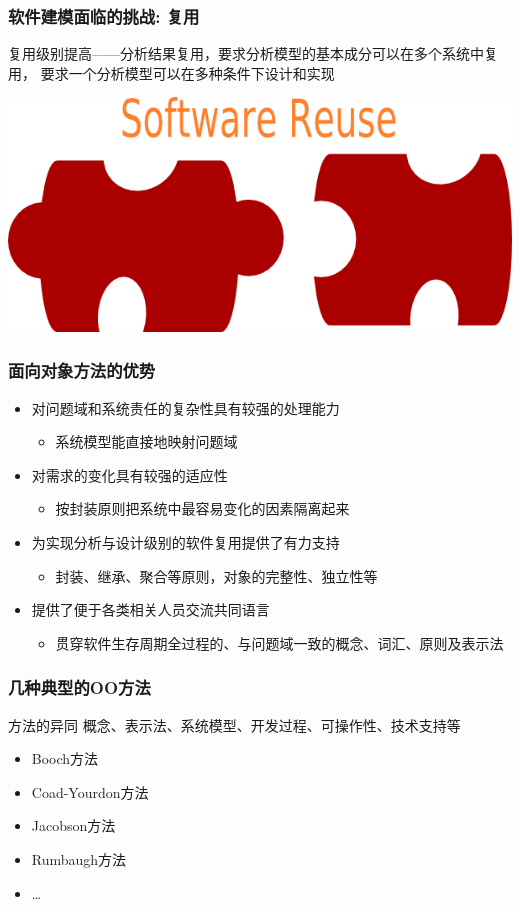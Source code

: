 \documentclass[compress]{beamer}
\begin{document}
\begin{frame}
\frametitle{软件建模面临的挑战: 复用}
复用级别提高——分析结果复用，要求分析模型的基本成分可以在多个系统中复用，
要求一个分析模型可以在多种条件下设计和实现
\begin{center}
\centering\includegraphics[width=0.5\hsize]{softwarereuse.png}
\end{center}
\end{frame}

\begin{frame}
\frametitle{面向对象方法的优势}
\begin{itemize}
\item 对问题域和系统责任的复杂性具有较强的处理能力
\begin{itemize}
\item 系统模型能直接地映射问题域
\end{itemize}
\item 对需求的变化具有较强的适应性
\begin{itemize}
\item 按封装原则把系统中最容易变化的因素隔离起来
\end{itemize}
\item 为实现分析与设计级别的软件复用提供了有力支持
\begin{itemize}
\item 封装、继承、聚合等原则，对象的完整性、独立性等
\end{itemize}

\item 提供了便于各类相关人员交流共同语言
\begin{itemize}
\item 贯穿软件生存周期全过程的、与问题域一致的概念、词汇、原则及表示法
\end{itemize}

\end{itemize}
\end{frame}

\begin{frame}
  \frametitle{几种典型的OO方法}
  \begin{block}{方法的异同}
    概念、表示法、系统模型、开发过程、可操作性、技术支持等
  \end{block}
  \begin{itemize}
    \item Booch方法
    \item Coad-Yourdon方法
    \item Jacobson方法
    \item Rumbaugh方法
    \item \ldots
  \end{itemize}
\end{frame}
\end{document}
